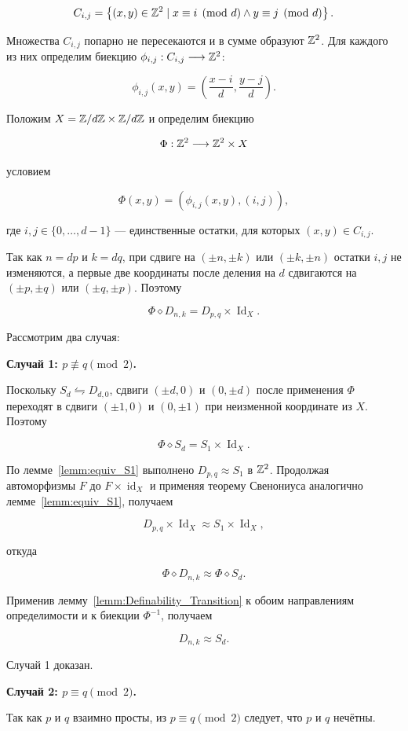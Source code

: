 $$C_{i,j}=\left\{(x,y)\in\mathbb{Z}^2\mid x\equiv i\pmod d\wedge y\equiv j\pmod d\right\}.$$

Множества $C_{i,j}$ попарно не пересекаются и в сумме образуют $\mathbb{Z}^2$. Для каждого из них определим биекцию $\phi_{i,j}:C_{i,j}\longrightarrow\mathbb{Z}^2$:

$$\phi_{i,j}(x,y)=\left(\frac{x-i}{d},\frac{y-j}{d}\right).$$

Положим $X=\mathbb{Z}/d\mathbb{Z}\times\mathbb{Z}/d\mathbb{Z}$ и определим биекцию

$$\Phi:\mathbb{Z}^2\longrightarrow\mathbb{Z}^2\times X$$

условием

$$\Phi(x,y)=(\phi_{i,j}(x,y),(i,j)),$$

где $i,j\in\{0,\dots,d-1\}$ --- единственные остатки, для которых $(x,y)\in C_{i,j}$.

Так как $n=dp$ и $k=dq$, при сдвиге на $(\pm n,\pm k)$ или $(\pm k,\pm n)$ остатки $i,j$ не изменяются, а первые две координаты после деления на $d$ сдвигаются на $(\pm p,\pm q)$ или $(\pm q,\pm p)$. Поэтому

$$\Phi\diamond D_{n,k}=D_{p,q}\times\operatorname{Id}_X.$$

Рассмотрим два случая:

\textbf{Случай 1: $p\not\equiv q\pmod 2$.}

Поскольку $S_d\leftrightharpoons D_{d,0}$, сдвиги $(\pm d,0)$ и $(0,\pm d)$ после применения $\Phi$ переходят в сдвиги $(\pm1,0)$ и $(0,\pm1)$ при неизменной координате из $X$. Поэтому

$$\Phi\diamond S_d=S_1\times\operatorname{Id}_X.$$

По лемме~\ref{lemm:equiv_S1} выполнено $D_{p,q}\approx S_1$ в $\mathbb{Z}^2$. Продолжая автоморфизмы $F$ до $F\times\operatorname{id}_X$ и применяя теорему Свенониуса аналогично лемме~\ref{lemm:equiv_S1}, получаем

$$D_{p,q}\times\operatorname{Id}_X\approx S_1\times\operatorname{Id}_X,$$

откуда

$$\Phi\diamond D_{n,k}\approx\Phi\diamond S_d.$$

Применив лемму~\ref{lemm:Definability_Transition} к обоим направлениям определимости и к биекции $\Phi^{-1}$, получаем

$$D_{n,k}\approx S_d.$$

Случай 1 доказан.

\bs
\textbf{Случай 2: $p\equiv q\pmod 2$.}

Так как $p$ и $q$ взаимно просты, из $p\equiv q\pmod 2$ следует, что $p$ и $q$ нечётны.


